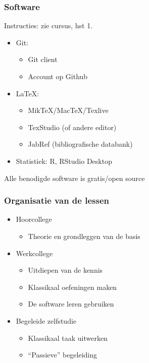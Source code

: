 \documentclass{beamer}
\begin{document}
\begin{frame}
  \frametitle{Software}
  
  Instructies: zie cursus, hst 1.
  
  \begin{itemize}
      \item Git:
      \begin{itemize}
          \item Git client
          \item Account op Github
      \end{itemize}
      \item {\LaTeX}:
      \begin{itemize}
          \item MikTeX/MacTeX/Texlive
          \item TexStudio (of andere editor)
          \item JabRef (bibliografische databank)
      \end{itemize}
      \item Statistiek: R, RStudio Desktop
  \end{itemize}

  \centering
  Alle benodigde software is gratis/open source
\end{frame}

\begin{frame}
  \frametitle{Organisatie van de lessen}

  \begin{itemize}
    \item Hoorcollege
      \begin{itemize}
        \item Theorie en grondleggen van de basis
      \end{itemize}
    \item Werkcollege
      \begin{itemize}
        \item Uitdiepen van de kennis
        \item Klassikaal oefeningen maken
        \item De software leren gebruiken
      \end{itemize}
    \item Begeleide zelfstudie
      \begin{itemize}
        \item Klassikaal taak uitwerken
        \item ``Passieve'' begeleiding
      \end{itemize}
  \end{itemize}
\end{frame}
\end{document}
